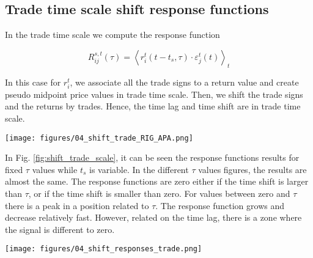 \subsection{Trade time scale shift response functions}
\label{subsec:time_shift_trade}

In the trade time scale we compute the response function

\begin{equation}\label{eq:time_shift_trade}
    R_{ij}^{s, t}\left(\tau\right)=\left\langle r^{t}_{i}
    \left(t-t_{s},\tau\right) \cdot\varepsilon^{t}_{j}
    \left(t\right)\right\rangle _{t}
\end{equation}

In this case for $r^{t}_{i}$, we associate all the trade signs to a return
value and create pseudo midpoint price values in trade time scale. Then, we
shift the trade signs and the returns by trades. Hence, the time lag and time
shift are in trade time scale.

\begin{figure*}[htbp]
    \centering
    \texttt{[image: figures/04\_shift\_trade\_RIG\_APA.png]}
    \caption{Self-response functions $R_{ii}^{t}\left(\tau\right)$ in 2008
             versus shift for the Transocean Ltd. stock (top) and
             cross-response functions $R_{ij}^{t}\left(\tau\right)$ excluding
             $\varepsilon^{t}_{j}\left(t\right) = 0$ in 2008 versus shift for
             the Transocean Ltd.-Apache Corp. stocks (bottom) in trade time
             scale.}
    \label{fig:shift_trade_scale}
\end{figure*}

In Fig. \ref{fig:shift_trade_scale}, it can be seen the response functions
results for fixed $\tau$ values while $t_{s}$ is variable. In the different
$\tau$ values figures, the results are almost the same. The response functions
are zero either if the time shift is larger than $\tau$, or if the time shift
is smaller than zero. For values between zero and $\tau$ there is a peak in a
position related to $\tau$. The response function grows and decrease relatively
fast. However, related on the time lag, there is a zone where the signal is
different to zero.

\begin{figure*}[htbp]
    \centering
    \texttt{[image: figures/04\_shift\_responses\_trade.png]}
    \caption{Self- and cross-response functions $R^{t}_{ij}\left(\tau\right)$
             in 2008 versus time lag $\tau$ on a logarithmic scale for
             different shifts in trade time scale. Self-response functions
             (left) of individual stocks and cross-response functions (right)
             of stocks pairs from the same economic sector.}
    \label{fig:shift_responses_trade_scale}
\end{figure*}


